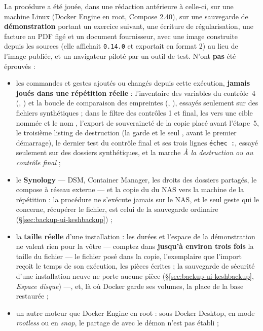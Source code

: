 \documentclass[a4paper,11pt,oneside]{article}
\begin{document}
\begin{keshnote}[title=Ce que cette procédure n'a pas éprouvé]
La procédure a été jouée, dans une rédaction antérieure à celle-ci, sur une machine Linux (Docker Engine en root, Compose 2.40), sur une sauvegarde de \textbf{démonstration} portant un exercice suivant, une écriture de régularisation, une facture au PDF figé et un document fournisseur, avec une image construite depuis les sources (elle affichait \texttt{0.14.0} et exportait en format 2) au lieu de l'image publiée, et un navigateur piloté par un outil de test. N'ont \textbf{pas} été éprouvés :
\begin{itemize}
    \item les commandes et gestes ajoutés ou changés depuis cette exécution, \textbf{jamais joués dans une répétition réelle} : l'inventaire des variables du contrôle~4 (, ) et la boucle de comparaison des empreintes (, ), essayés seulement sur des fichiers synthétiques ;  dans le filtre des contrôles 1 et final, les  vers une cible nommée et le nom , l'export de souveraineté de la copie placé avant l'étape~5, le troisième listing de destruction (la garde et le seul , avant le premier démarrage), le dernier test du contrôle final et ses trois lignes \texttt{échec :}, essayé seulement sur des dossiers synthétiques, et la marche \emph{À la destruction ou au contrôle final} ;
    \item le \textbf{Synology} --- DSM, Container Manager, les droits des dossiers partagés, le compose à réseau externe --- et la copie du  du NAS vers la machine de la répétition : la procédure ne s'exécute jamais sur le NAS, et le seul geste qui le concerne, récupérer le fichier, est celui de la sauvegarde ordinaire (\S\ref{sec:backup-ui-keshbackup}) ;
    \item la \textbf{taille réelle} d'une installation : les durées et l'espace de la démonstration ne valent rien pour la vôtre --- comptez dans  \textbf{jusqu'à environ trois fois} la taille du fichier --- le fichier posé dans la copie, l'exemplaire que l'import reçoit le temps de son exécution, les pièces écrites ; la sauvegarde de sécurité d'une installation neuve ne porte aucune pièce (\S\ref{sec:backup-ui-keshbackup}, \emph{Espace disque}) ---, et, là où Docker garde ses volumes, la place de la base restaurée ;
    \item un autre moteur que Docker Engine en root : sous Docker Desktop, en mode \emph{rootless} ou en \emph{snap}, le partage de  avec le démon n'est pas établi ;

\end{itemize}
\end{keshnote}
\end{document}
